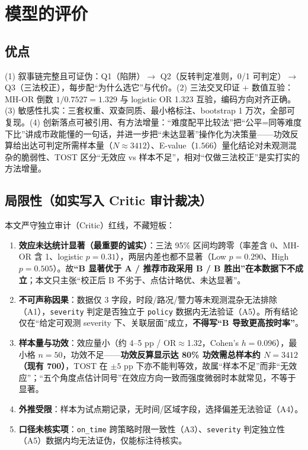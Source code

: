 \documentclass[12pt,a4paper]{ctexart}
\begin{document}
\section{模型的评价}
\subsection{优点}
(1) 叙事链完整且可证伪：Q1（陷阱）$\to$ Q2（反转判定准则，0/1 可判定）$\to$ Q3（三法校正），每步配``为什么选它''与代价。(2) 三法交叉印证 + 数值互验：MH-OR 倒数 $1/0.7527=1.329$ 与 logistic OR 1.323 互验，编码方向对齐正确。(3) 敏感性扎实：三套权重、双查同质、最小格标注、bootstrap 1 万次，全部可复现。(4) 创新落点可被引用、有方法增量：``难度配平比较法''把``公平=同等难度下比''讲成市政能懂的一句话，并进一步把``未达显著''操作化为决策量——功效反算给出达可判定所需样本量（$N\approx3412$）、E-value（$1.566$）量化结论对未观测混杂的脆弱性、TOST 区分``无效应 vs 样本不足''，相对``仅做三法校正''是实打实的方法增量。

\subsection{局限性（如实写入 Critic 审计裁决）}
本文严守独立审计（Critic）红线，不藏短板：
\begin{enumerate}
\item \textbf{效应未达统计显著（最重要的诚实）}：三法 95\% 区间均跨零（率差含 0、MH-OR 含 1、logistic $p=0.31$），两层内差也都不显著（Low $p=0.290$、High $p=0.505$）。故\textbf{``B 显著优于 A / 推荐市政采用 B / B 胜出''在本数据下不成立}；本文只主张``校正后 B 不劣于、点估计略优、未达显著''。
\item \textbf{不可声称因果}：数据仅 3 字段，时段/路况/警力等未观测混杂无法排除（A1），\texttt{severity} 判定是否独立于 \texttt{policy} 数据内无法验证（A5）。所有结论仅在``给定可观测 severity 下、关联层面''成立，\textbf{不得写``B 导致更高按时率''}。
\item \textbf{样本量与功效}：效应量小（约 4--5 pp / OR$\approx$1.32，Cohen's $h=0.096$），最小格 $n=50$，功效不足——\textbf{功效反算显示达 80\% 功效需总样本约 $N=3412$（现有 700）}，TOST 在 $\pm5$ pp 下亦不能判等效，故属``样本不足''而非``无效应''；``五个角度点估计同号''在效应方向一致而强度微弱时本就常见，不等于显著。
\item \textbf{外推受限}：样本为试点期记录，无时间/区域字段，选择偏差无法验证（A4）。
\item \textbf{口径未核实项}：\texttt{on\_time} 跨策略时限一致性（A3）、\texttt{severity} 判定独立性（A5）数据内均无法证伪，仅能标注待核实。
\end{enumerate}
\end{document}
